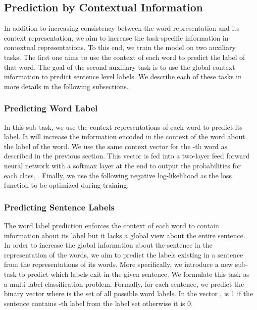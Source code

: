 \documentclass[11pt,a4paper]{article}
\begin{document}
\subsection{Prediction by Contextual Information}
In addition to increasing consistency between the word representation and its context representation, we aim to increase the task-specific information in contextual representations. To this end, we train the model on two auxiliary tasks. The first one aims to use the context of each word to predict the label of that word. The goal of the second auxiliary task is to use the global context information to predict sentence level labels. We describe each of these tasks in more details in the following subsections.





\subsubsection*{Predicting Word Label}
In this sub-task, we use the context representations of each word to predict its label. It will increase the information encoded in the context of the word about the label of the word. We use the same context vector  for the -th word as described in the previous section. This vector is fed into a two-layer feed forward neural network with a softmax layer at the end to output the probabilities for each class, . Finally, we use the following negative log-likelihood as the loss function to be optimized during training:







\subsubsection*{Predicting Sentence Labels}
The word label prediction enforces the context of each word to contain information about its label but it lacks a global view about the entire sentence. In order to increase the global information about the sentence in the representation of the words, we aim to predict the labels existing in a sentence from the representations of its words. More specifically, we introduce a new sub-task to predict which labels exit in the given sentence. We formulate this task as a multi-label classification problem. Formally, for each sentence, we predict the binary vector  where  is the set of all possible word labels. In the vector ,  is 1 if the sentence  contains -th label from the label set  otherwise it is 0.
\end{document}
